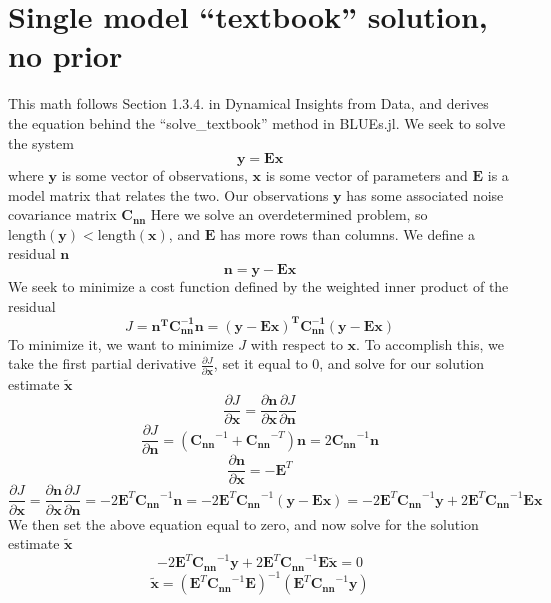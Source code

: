 \documentclass{article}
\begin{document}
\section{Single model ``textbook'' solution, no prior}
This math follows Section 1.3.4. in Dynamical Insights from Data, and derives the equation behind the ``solve\_textbook'' method in BLUEs.jl. 
We seek to solve the system
\begin{equation}
\label{eq:2}
\mathbf{y = Ex}
\end{equation}
where $\mathbf{y}$ is some vector of observations, $\mathbf{x}$ is some vector of parameters and $\mathbf{E}$ is a model matrix that relates the two. Our observations $\mathbf{y}$ has some associated noise covariance matrix $\mathbf{C_{nn}}$ Here we solve an overdetermined problem, so $\text{length}(\mathbf{y}) < \text{length}(\mathbf{x})$, and $\textbf{E}$ has more rows than columns. We define a residual $\mathbf{n}$
\begin{equation}
\label{eq:3}
\mathbf{n = y - Ex}
\end{equation}
We seek to minimize a cost function defined by the weighted inner product of the residual
\begin{equation}
\label{eq:1}
J = \mathbf{n^TC_{nn}^{-1}n = (y - Ex)^TC_{nn}^{-1}(y-Ex)}
\end{equation}
To minimize it, we want to minimize $J$ with respect to $\mathbf{x}$. To accomplish this, we take the first partial derivative $\frac{\partial J}{\partial \mathbf{x}}$, set it equal to 0, and solve for our solution estimate $\mathbf{\tilde{x}}$
\begin{equation}
\label{eq:4}
\frac{\partial J}{\partial\mathbf{x}} = \frac{\partial \mathbf{n}}{\partial \mathbf{x}}\frac{\partial J}{\partial \mathbf{n}}
\end{equation}
\begin{equation}
\label{eq:5}
\frac{\partial J}{\partial \mathbf{n}} = (\mathbf{C_{nn}}^{-1} + \mathbf{C_{nn}}^{-T})\mathbf{n} = 2 \mathbf{C_{nn}}^{-1} \mathbf{n}
\end{equation}
\begin{equation}
\label{eq:6}
\frac{\partial \mathbf{n}}{\partial \mathbf{x}} = -\mathbf{E}^{T}
\end{equation}
\begin{equation}
\label{eq:7}
\frac{\partial J}{\partial\mathbf{x}} = \frac{\partial \mathbf{n}}{\partial \mathbf{x}}\frac{\partial J}{\partial \mathbf{n}} = -2 \mathbf{E}^T \mathbf{C_{nn}}^{-1} \mathbf{n} = -2 \mathbf{E}^T \mathbf{C_{nn}}^{-1} (\mathbf{y} - \mathbf{Ex}) = -2 \mathbf{E}^T\mathbf{C_{nn}}^{-1}\mathbf{y} + 2 \mathbf{E}^T\mathbf{C_{nn}}^{-1}\mathbf{Ex}
\end{equation}
We then set the above equation equal to zero, and now solve for the solution estimate $\mathbf{\tilde{x}}$
\begin{equation}
  \label{eq:8}
 -2 \mathbf{E}^T\mathbf{C_{nn}}^{-1}\mathbf{y} + 2 \mathbf{E}^T\mathbf{C_{nn}}^{-1}\mathbf{E\tilde{x}}= 0 
\end{equation}
\begin{equation}
\label{eq:9}
\mathbf{\tilde{x}} = (\mathbf{E}^{T}\mathbf{C_{nn}}^{-1}\mathbf{E})^{-1}(\mathbf{E}^T\mathbf{C_{nn}}^{-1}\mathbf{y})
\end{equation}
\end{document}
